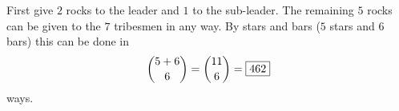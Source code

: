 First give $2$ rocks to the leader and $1$ to the sub-leader. The remaining $5$ rocks can be given to the $7$ tribesmen in any way. By stars and bars ($5$ stars and $6$ bars) this can be done in
\[\dbinom{5+6}{6}=\dbinom{11}{6}=\boxed{462}\]
ways.
